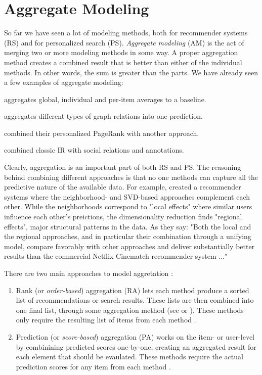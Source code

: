 \section{Aggregate Modeling}
\label{sec:aggregate}

So far we have seen a lot of modeling methods, both for recommender systems (RS) and for personalized search (PS).
\emph{Aggregate modeling} (AM) is the act of merging two or more modeling methods in some way.
A proper aggregation method creates a combined result that is better than either of the individual methods.
In other words, the sum is greater than the parts.
We have already seen a few examples of aggregate modeling:

\begin{itemize*}
  \item \cite{Koren2008} aggregates global, individual and per-item averages to a baseline.
  \item \cite{Huang2002} aggregates different types of graph relations into one prediction.
  \item \citet{Haveliwala2003} combined their personalized PageRank with another approach.
  \item \cite{Carmel2009} combined classic IR with social relations and annotations.
\end{itemize*}

Clearly, aggregation is an important part of both RS and PS.
The reasoning behind combining different approaches is that no one methods
can capture all the predictive nature of the available data.
For example, 
\cite{Bell2007b} created a recommender systems where the neighborhood- and SVD-based approaches complement each other.
While the neighborhoods correspond to "local effects" where similar users influence each other's preictions,
the dimensionality reduction finds "regional effects", major structural patterns in the data.
As they say: 
"Both the local and the regional approaches, and in particular their combination through a unifying model, 
compare favorably with other approaches and deliver substantially better results than the 
commercial Netflix Cinematch recommender system ..."
\cite[p1]{Bell2007b}

There are two main approaches to model aggretation \cite[p1]{Liu2007}: 

\begin{enumerate}
  \item Rank (or \emph{order-based}) aggregation (RA) lets each method
  produce a sorted list of recommendations or search results. These lists are then combined
  into one final list, through some aggregation method (see \cite{Dwork2001} or \cite{Klementiev2008}).
  These methods only require the resulting list of items from each method \cite[p1]{Aslam2001}.

  \item Prediction (or \emph{score-based}) aggregation (PA) works on the item- or user-level by combinining predicted scores
  one-by-one, creating an aggregated result for each element that should be evaulated.
  These methods require the actual prediction scores for any item from each method \cite[p2]{Aslam2001}.
\end{enumerate}

